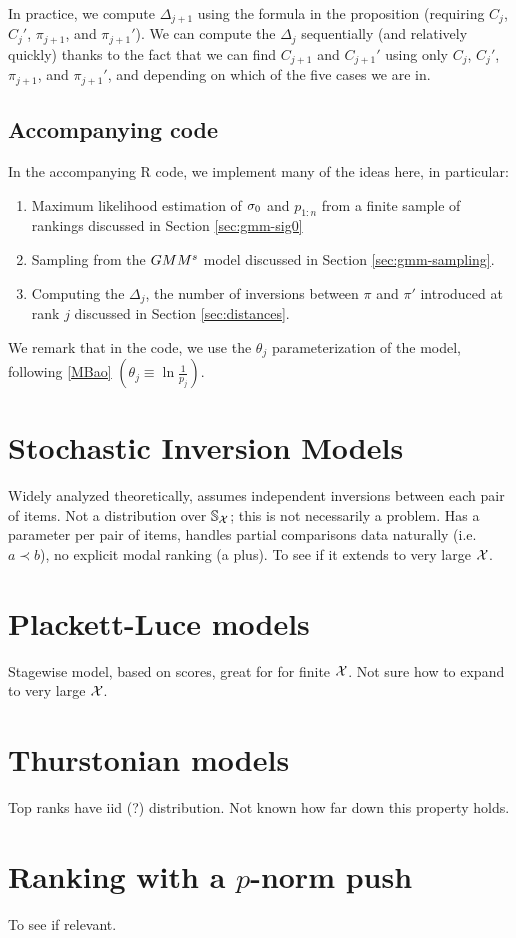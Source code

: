 \documentclass[10pt]{article}
\newcommand\bl{\left(}
\newcommand\br{\right)}
\begin{document}
In practice, we compute $\Delta_{j+1}$ using the formula in the proposition (requiring $C_{j}$, $C_{j}'$, $\pi_{j+1}$, and $\pi_{j+1}'$). We can compute the $\Delta_j$ sequentially (and relatively quickly) thanks to the fact that we can find $C_{j+1}$ and $C_{j+1}'$ using only $C_{j}$, $C_{j}'$, $\pi_{j+1}$, and $\pi_{j+1}'$, and depending on which of the five cases we are in.

\subsection{Accompanying code}
In the accompanying R code, we implement many of the ideas here, in particular:
\begin{enumerate}
    \item Maximum likelihood estimation of $\sigma_0$ and $p_{1:n}$ from a finite sample of rankings discussed in Section \ref{sec:gmm-sig0}
    \item Sampling from the $GMM^s$ model discussed in Section \ref{sec:gmm-sampling}.
    \item Computing the $\Delta_j$, the number of inversions between $\pi$ and $\pi'$ introduced at rank $j$ discussed in Section \ref{sec:distances}.
\end{enumerate}

We remark that in the code, we use the $\theta_j$ parameterization of the model, following \ref{MBao} $\bl \theta_j \equiv \ln{\frac{1}{p_j}} \br$.
\section{Stochastic Inversion Models}
\label{sec:stoch-i-m}
Widely analyzed theoretically, assumes independent inversions between each pair of items. Not a distribution over ${\mathbb S}_{{\mathcal X}}$; this is not necessarily a problem. Has a parameter per pair of items, handles partial comparisons data naturally (i.e. $a \prec b$), no explicit modal ranking (a plus). To see if it extends to very large ${\mathcal X}$. 


\section{Plackett-Luce models}
\label{sec:pl}
Stagewise model, based on scores, great for \topt for finite ${\mathcal X}$. Not sure how to expand to very large ${\mathcal X}$. 

\section{Thurstonian models}
\label{sec:thurst}
Top ranks have iid (?) distribution. Not known how far down this property holds.
\section{Ranking with a $p$-norm push}
\label{sec:push}
To see if relevant.

\appendix




    
\end{document}
